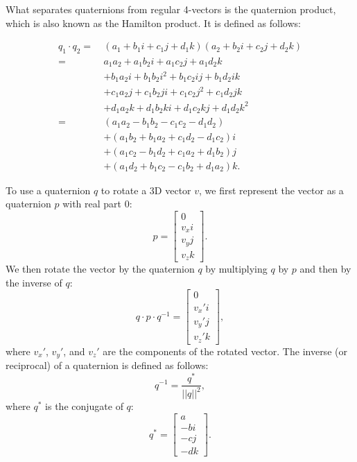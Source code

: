 What separates quaternions from regular 4-vectors is the quaternion product, which is also known as the Hamilton product. It is defined as follows:

\begin{equation}
\label{eqn:quat-product}
\begin{aligned}
    q_1 \cdot q_2 =\ &(a_1 + b_1 i + c_1 j + d_1 k) (a_2 + b_2 i + c_2 j + d_2 k) \\
    =\ &a_1 a_2 + a_1 b_2 i + a_1 c_2 j + a_1 d_2 k
    \\ &+ b_1 a_2 i + b_1 b_2 i^2 + b_1 c_2 i j + b_1 d_2 i k
    \\ &+ c_1 a_2 j + c_1 b_2 j i + c_1 c_2 j^2 + c_1 d_2 j k
    \\ &+ d_1 a_2 k + d_1 b_2 k i + d_1 c_2 k j + d_1 d_2 k^2
    \\
    =\ &(a_1 a_2 - b_1 b_2 - c_1 c_2 - d_1 d_2)
    \\ &+ (a_1 b_2 + b_1 a_2 + c_1 d_2 - d_1 c_2) i
    \\ &+ (a_1 c_2 - b_1 d_2 + c_1 a_2 + d_1 b_2) j
    \\ &+ (a_1 d_2 + b_1 c_2 - c_1 b_2 + d_1 a_2) k.
\end{aligned}
\end{equation}

To use a quaternion $q$ to rotate a 3D vector $v$, we first represent the vector as a quaternion $p$ with real part 0:
\begin{equation}
\label{eqn:quat-vector}
    p = \begin{bmatrix}
        0 \\
        v_x i \\
        v_y j \\
        v_z k
    \end{bmatrix}.
\end{equation}
We then rotate the vector by the quaternion $q$ by multiplying $q$ by $p$ and then by the inverse of $q$:
\begin{equation}
\label{eqn:quat-rotate}
    q \cdot p \cdot q^{-1} = \begin{bmatrix}
        0 \\
        v_x' i \\
        v_y' j \\
        v_z' k
    \end{bmatrix},
\end{equation}
where $v_x'$, $v_y'$, and $v_z'$ are the components of the rotated vector. The inverse (or reciprocal) of a quaternion is defined as follows:
\begin{equation}
\label{eqn:quat-inverse}
    q^{-1} = \frac{q^*}{||q||^2},
\end{equation}
where $q^*$ is the conjugate of $q$:
\begin{equation}
\label{eqn:quat-conjugate}
    q^* = \begin{bmatrix}
        a \\
        -b i \\
        -c j \\
        -d k
    \end{bmatrix}.
\end{equation}

